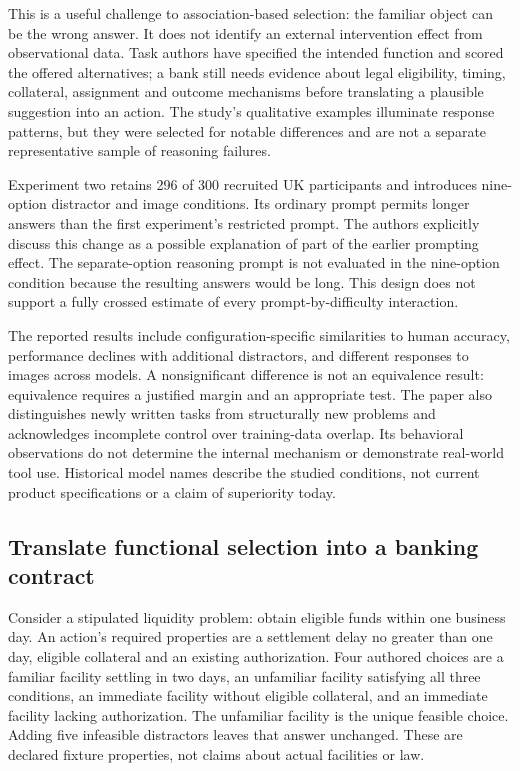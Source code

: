 This is a useful challenge to association-based selection: the familiar object can be the wrong answer. It does not identify an external intervention effect from observational data. Task authors have specified the intended function and scored the offered alternatives; a bank still needs evidence about legal eligibility, timing, collateral, assignment and outcome mechanisms before translating a plausible suggestion into an action. The study's qualitative examples illuminate response patterns, but they were selected for notable differences and are not a separate representative sample of reasoning failures.~\citep{exec24_affordance_original,exec24_affordance_fuzzing_reference}

Experiment two retains 296 of 300 recruited UK participants and introduces nine-option distractor and image conditions. Its ordinary prompt permits longer answers than the first experiment's restricted prompt. The authors explicitly discuss this change as a possible explanation of part of the earlier prompting effect. The separate-option reasoning prompt is not evaluated in the nine-option condition because the resulting answers would be long. This design does not support a fully crossed estimate of every prompt-by-difficulty interaction.~\citep{exec24_affordance_original}

The reported results include configuration-specific similarities to human accuracy, performance declines with additional distractors, and different responses to images across models. A nonsignificant difference is not an equivalence result: equivalence requires a justified margin and an appropriate test. The paper also distinguishes newly written tasks from structurally new problems and acknowledges incomplete control over training-data overlap. Its behavioral observations do not determine the internal mechanism or demonstrate real-world tool use. Historical model names describe the studied conditions, not current product specifications or a claim of superiority today.~\citep{exec24_affordance_original,exec24_affordance_fuzzing_reference}

\subsection{Translate functional selection into a banking contract}
Consider a stipulated liquidity problem: obtain eligible funds within one business day. An action's required properties are a settlement delay no greater than one day, eligible collateral and an existing authorization. Four authored choices are a familiar facility settling in two days, an unfamiliar facility satisfying all three conditions, an immediate facility without eligible collateral, and an immediate facility lacking authorization. The unfamiliar facility is the unique feasible choice. Adding five infeasible distractors leaves that answer unchanged. These are declared fixture properties, not claims about actual facilities or law.~\citep{exec24_affordance_fuzzing_reference}

